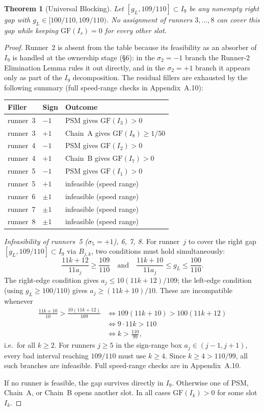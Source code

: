 \documentclass[12pt,a4paper]{amsart}
\newtheorem{theorem}{Theorem}[section]
\theoremstyle{definition}
\theoremstyle{remark}
\newcommand{\GF}{\mathrm{GF}}
\begin{document}
\begin{theorem}[Universal Blocking]\label{thm:ub}
Let $[g_L,109/110]\subset I_9$ be any nonempty right gap with $g_L\in[100/110,109/110)$.
No assignment of runners $3,\ldots,8$ can cover this gap while keeping $\GF(I_s)=0$ for
every other slot.
\end{theorem}

\begin{proof}
Runner~2 is absent from the table because its feasibility as an absorber of $I_9$ is
handled at the ownership stage (§6): in the $\sigma_2=-1$ branch the Runner-2 Elimination
Lemma rules it out directly, and in the $\sigma_2=+1$ branch it appears only as part of
the $I_9$ decomposition. The residual fillers are exhausted by the following summary
(full speed-range checks in Appendix~A.10):

\medskip
\begin{center}
\begin{tabular}{lll}
\toprule
Filler & Sign & Outcome \\
\midrule
runner~3 & $-1$ & PSM gives $\GF(I_3)>0$ \\
runner~3 & $+1$ & Chain~A gives $\GF(I_8)\ge 1/50$ \\
runner~4 & $-1$ & PSM gives $\GF(I_2)>0$ \\
runner~4 & $+1$ & Chain~B gives $\GF(I_7)>0$ \\
runner~5 & $-1$ & PSM gives $\GF(I_1)>0$ \\
runner~5 & $+1$ & infeasible (speed range) \\
runner~6 & $\pm1$ & infeasible (speed range) \\
runner~7 & $\pm1$ & infeasible (speed range) \\
runner~8 & $\pm1$ & infeasible (speed range) \\
\bottomrule
\end{tabular}
\end{center}

\medskip
\textit{Infeasibility of runners~5 ($\sigma_5=+1$), 6, 7, 8.} For runner~$j$ to cover
the right gap $[g_L,109/110]\subset I_9$ via $B_{j,k}$, two conditions must hold
simultaneously:
\[
  \frac{11k+12}{11a_j}\ge\frac{109}{110}\quad\text{and}\quad
  \frac{11k+10}{11a_j}\le g_L \le \frac{100}{110}.
\]
The right-edge condition gives $a_j\le 10(11k+12)/109$; the left-edge condition (using
$g_L\ge 100/110$) gives $a_j\ge(11k+10)/10$. These are incompatible whenever
\begin{align*}
  \frac{11k+10}{10} > \frac{10(11k+12)}{109}
  &\iff 109(11k+10)>100(11k+12) \\
  &\iff 9\cdot 11k > 110 \\
  &\iff k > \frac{110}{99},
\end{align*}
i.e.\ for all $k\ge 2$. For runners $j\ge 5$ in the sign-range box
$a_j\in(j-1,j+1)$, every bad interval reaching $109/110$ must use $k\ge 4$.
Since $k\ge 4>110/99$, all such branches are infeasible. Full speed-range checks are in Appendix~A.10.

If no runner is feasible, the gap survives directly in $I_9$. Otherwise one of PSM,
Chain~A, or Chain~B opens another slot. In all cases $\GF(I_k)>0$ for some slot $I_k$.
\end{proof}
\end{document}
